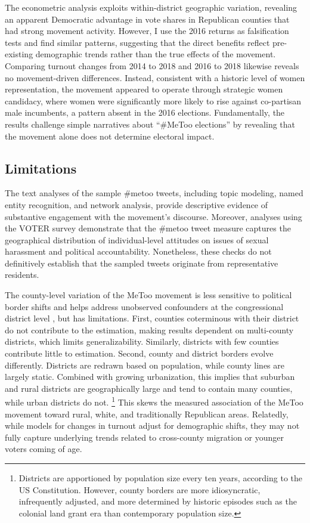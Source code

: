 \documentclass[manuscript,screen,nonacm,11pt,acm]{acmart}
\begin{document}
The econometric analysis exploits within-district geographic variation, revealing an apparent Democratic advantage in vote shares in Republican counties that had strong movement activity.
However, I use the 2016 returns as falsification tests and find similar patterns, suggesting that the direct benefits reflect pre-existing demographic trends rather than the true effects of the movement.
Comparing turnout changes from 2014 to 2018 and 2016 to 2018 likewise reveals no movement-driven differences.
Instead, consistent with a historic level of women representation, the movement appeared to operate through strategic women candidacy, where women were significantly more likely to rise against co-partisan male incumbents, a pattern absent in the 2016 elections.
Fundamentally, the results challenge simple narratives about ``\#MeToo elections'' by revealing that the movement alone does not determine electoral impact.

\subsection{Limitations}
The text analyses of the sample \#metoo tweets, including topic modeling, named entity recognition, and network analysis, provide descriptive evidence of substantive engagement with the movement's discourse.
Moreover, analyses using the VOTER survey demonstrate that the \#metoo tweet measure captures the geographical distribution of individual-level attitudes on issues of sexual harassment and political accountability.
Nonetheless, these checks do not definitively establish that the sampled tweets originate from representative residents.

The county-level variation of the MeToo movement is less sensitive to political border shifts and helps address unobserved confounders at the congressional district level \citep[e.g.,][]{cs, womenmarch, DellaVigna2007}, but has limitations.
First, counties coterminous with their district do not contribute to the estimation, making results dependent on multi-county districts, which limits generalizability.
Similarly, districts with few counties contribute little to estimation.
Second, county and district borders evolve differently.
Districts are redrawn based on population, while county lines are largely static.
Combined with growing urbanization, this implies that suburban and rural districts are geographically large and tend to contain many counties, while urban districts do not.%
\footnote{Districts are apportioned by population size every ten years, according to the US Constitution. However, county borders are more idiosyncratic, infrequently adjusted, and more determined by historic episodes such as the colonial land grant era than contemporary population size.}
This skews the measured association of the MeToo movement toward rural, white, and traditionally Republican areas.
Relatedly, while models for changes in turnout adjust for demographic shifts, they may not fully capture underlying trends related to cross-county migration or younger voters coming of age.
\end{document}
